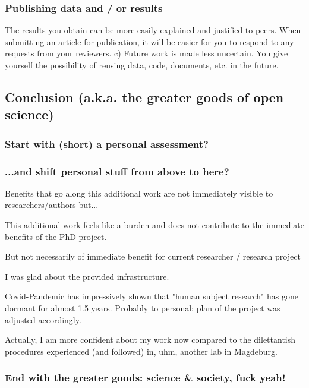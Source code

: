 \subsubsection{Publishing data and / or results}

The results you obtain can be more easily explained and justified to peers.
%
When submitting an article for publication, it will be easier for you to respond
to any requests from your reviewers.
%
c) Future work is made less uncertain.
%
You give yourself the possibility of reusing data, code, documents, etc. in the
future.



\subsection{Conclusion (a.k.a. the greater goods of open science)}


\subsubsection{Start with (short) a personal assessment?}

\subsubsection{...and shift personal stuff from above to here?}



Benefits that go along this additional work are not immediately
visible to researchers/authors but...

%
This additional work feels like a burden and does not contribute to the
immediate benefits of the PhD project.

%
But not necessarily of immediate benefit for current researcher / research
project

I was glad about the provided infrastructure.

%
Covid-Pandemic has impressively shown that "human subject research" has gone
dormant for almost 1.5 years.
%
Probably to personal: plan of the project was adjusted accordingly.

%
Actually, I am more confident about my work now compared to the dilettantish
procedures experienced (and followed) in, uhm, another lab in Magdeburg.


\subsubsection{End with the greater goods: science \& society, fuck yeah!}


